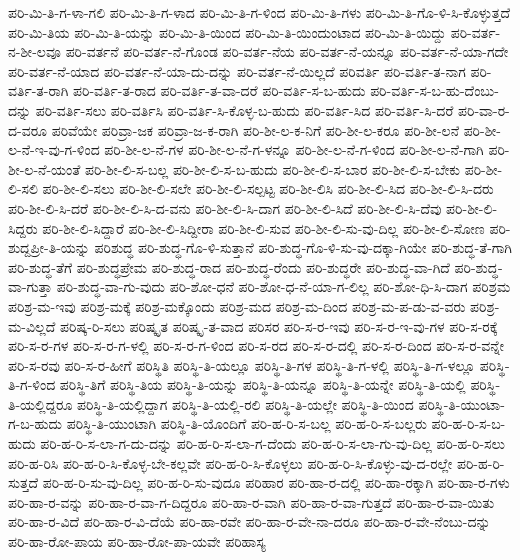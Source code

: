 {ಪರಿ-ಮಿ-ತಿ-ಗ-ಳಾ-ಗಲಿ
ಪರಿ-ಮಿ-ತಿ-ಗ-ಳಾದ
ಪರಿ-ಮಿ-ತಿ-ಗ-ಳಿಂದ
ಪರಿ-ಮಿ-ತಿ-ಗಳು
ಪರಿ-ಮಿ-ತಿ-ಗೊ-ಳಿ-ಸಿ-ಕೊಳ್ಳುತ್ತದೆ
ಪರಿ-ಮಿ-ತಿಯ
ಪರಿ-ಮಿ-ತಿ-ಯನ್ನು
ಪರಿ-ಮಿ-ತಿ-ಯಿಂದ
ಪರಿ-ಮಿ-ತಿ-ಯಿಂದುಂಟಾದ
ಪರಿ-ಮಿ-ತಿ-ಯಿದ್ದು
ಪರಿ-ವರ್ತ-ನ-ಶೀ-ಲವೂ
ಪರಿ-ವರ್ತನೆ
ಪರಿ-ವರ್ತ-ನೆ-ಗೊಂಡ
ಪರಿ-ವರ್ತ-ನೆಯ
ಪರಿ-ವರ್ತ-ನೆ-ಯನ್ನೂ
ಪರಿ-ವರ್ತ-ನೆ-ಯಾ-ಗದೇ
ಪರಿ-ವರ್ತ-ನೆ-ಯಾದ
ಪರಿ-ವರ್ತ-ನೆ-ಯಾ-ದು-ದನ್ನು
ಪರಿ-ವರ್ತ-ನೆ-ಯಿಲ್ಲದೆ
ಪರಿವರ್ತಿ
ಪರಿ-ವರ್ತಿ-ತ-ನಾಗ
ಪರಿ-ವರ್ತಿ-ತ-ರಾಗಿ
ಪರಿ-ವರ್ತಿ-ತ-ರಾದ
ಪರಿ-ವರ್ತಿ-ತ-ವಾ-ದರೆ
ಪರಿ-ವರ್ತಿ-ಸ-ಬ-ಹುದು
ಪರಿ-ವರ್ತಿ-ಸ-ಬ-ಹು-ದೆಂಬು-ದನ್ನು
ಪರಿ-ವರ್ತಿ-ಸಲು
ಪರಿ-ವರ್ತಿಸಿ
ಪರಿ-ವರ್ತಿ-ಸಿ-ಕೊಳ್ಳ-ಬ-ಹುದು
ಪರಿ-ವರ್ತಿ-ಸಿದ
ಪರಿ-ವರ್ತಿ-ಸಿ-ದರೆ
ಪರಿ-ವಾ-ರ-ದ-ವರೂ
ಪರಿವೆಯೇ
ಪರಿವ್ರಾ-ಜಕ
ಪರಿವ್ರಾ-ಜ-ಕ-ರಾಗಿ
ಪರಿ-ಶೀ-ಲ-ಕ-ನಿಗೆ
ಪರಿ-ಶೀ-ಲ-ಕರೂ
ಪರಿ-ಶೀ-ಲನೆ
ಪರಿ-ಶೀ-ಲ-ನೆ-ಇ-ವು-ಗ-ಳಿಂದ
ಪರಿ-ಶೀ-ಲ-ನೆ-ಗಳ
ಪರಿ-ಶೀ-ಲ-ನೆ-ಗ-ಳನ್ನೂ
ಪರಿ-ಶೀ-ಲ-ನೆ-ಗ-ಳಿಂದ
ಪರಿ-ಶೀ-ಲ-ನೆ-ಗಾಗಿ
ಪರಿ-ಶೀ-ಲ-ನೆ-ಯಂತೆ
ಪರಿ-ಶೀ-ಲಿ-ಸ-ಬಲ್ಲ
ಪರಿ-ಶೀ-ಲಿ-ಸ-ಬ-ಹುದು
ಪರಿ-ಶೀ-ಲಿ-ಸ-ಬಾರ
ಪರಿ-ಶೀ-ಲಿ-ಸ-ಬೇಕು
ಪರಿ-ಶೀ-ಲಿ-ಸಲಿ
ಪರಿ-ಶೀ-ಲಿ-ಸಲು
ಪರಿ-ಶೀ-ಲಿ-ಸಲೇ
ಪರಿ-ಶೀ-ಲಿ-ಸಲ್ಪಟ್ಟ
ಪರಿ-ಶೀ-ಲಿಸಿ
ಪರಿ-ಶೀ-ಲಿ-ಸಿದ
ಪರಿ-ಶೀ-ಲಿ-ಸಿ-ದರು
ಪರಿ-ಶೀ-ಲಿ-ಸಿ-ದರೆ
ಪರಿ-ಶೀ-ಲಿ-ಸಿ-ದ-ವನು
ಪರಿ-ಶೀ-ಲಿ-ಸಿ-ದಾಗ
ಪರಿ-ಶೀ-ಲಿ-ಸಿದೆ
ಪರಿ-ಶೀ-ಲಿ-ಸಿ-ದೆವು
ಪರಿ-ಶೀ-ಲಿ-ಸಿದ್ದರು
ಪರಿ-ಶೀ-ಲಿ-ಸಿದ್ದಾರೆ
ಪರಿ-ಶೀ-ಲಿ-ಸಿದ್ದೀರಾ
ಪರಿ-ಶೀ-ಲಿ-ಸುವ
ಪರಿ-ಶೀ-ಲಿ-ಸು-ವು-ದಿಲ್ಲ
ಪರಿ-ಶೀ-ಲಿ-ಸೋಣ
ಪರಿ-ಶುದ್ದಪ್ರೀ-ತಿ-ಯನ್ನು
ಪರಿಶುದ್ಧ
ಪರಿ-ಶುದ್ಧ-ಗೊ-ಳಿ-ಸುತ್ತಾನೆ
ಪರಿ-ಶುದ್ಧ-ಗೊ-ಳಿ-ಸು-ವು-ದಕ್ಕಾ-ಗಿಯೇ
ಪರಿ-ಶುದ್ಧ-ತೆ-ಗಾಗಿ
ಪರಿ-ಶುದ್ಧ-ತೆಗೆ
ಪರಿ-ಶುದ್ಧಪ್ರೇಮ
ಪರಿ-ಶುದ್ಧ-ರಾದ
ಪರಿ-ಶುದ್ಧ-ರೆಂದು
ಪರಿ-ಶುದ್ಧರೇ
ಪರಿ-ಶುದ್ಧ-ವಾ-ಗಿದೆ
ಪರಿ-ಶುದ್ಧ-ವಾ-ಗುತ್ತಾ
ಪರಿ-ಶುದ್ಧ-ವಾ-ಗು-ವುದು
ಪರಿ-ಶೋ-ಧನೆ
ಪರಿ-ಶೋ-ಧ-ನೆ-ಯಾ-ಗ-ಲಿಲ್ಲ
ಪರಿ-ಶೋ-ಧಿ-ಸಿ-ದಾಗ
ಪರಿಶ್ರಮ
ಪರಿಶ್ರ-ಮ-ಇವು
ಪರಿಶ್ರ-ಮಕ್ಕೆ
ಪರಿಶ್ರ-ಮಕ್ಕೊಂದು
ಪರಿಶ್ರ-ಮದ
ಪರಿಶ್ರ-ಮ-ದಿಂದ
ಪರಿಶ್ರ-ಮ-ಪ-ಡು-ವ-ವರು
ಪರಿಶ್ರ-ಮ-ವಿಲ್ಲದೆ
ಪರಿಷ್ಕ-ರಿ-ಸಲು
ಪರಿಷ್ಕೃತ
ಪರಿಷ್ಕೃ-ತ-ವಾದ
ಪರಿಸರ
ಪರಿ-ಸ-ರ-ಇವು
ಪರಿ-ಸ-ರ-ಇ-ವು-ಗಳ
ಪರಿ-ಸ-ರಕ್ಕೆ
ಪರಿ-ಸ-ರ-ಗಳ
ಪರಿ-ಸ-ರ-ಗ-ಳಲ್ಲಿ
ಪರಿ-ಸ-ರ-ಗ-ಳಿಂದ
ಪರಿ-ಸ-ರದ
ಪರಿ-ಸ-ರ-ದಲ್ಲಿ
ಪರಿ-ಸ-ರ-ದಿಂದ
ಪರಿ-ಸ-ರ-ವನ್ನೇ
ಪರಿ-ಸ-ರವು
ಪರಿ-ಸ-ರ-ಹೀಗೆ
ಪರಿಸ್ಥಿತಿ
ಪರಿಸ್ಥಿ-ತಿ-ಯಲ್ಲೂ
ಪರಿಸ್ಥಿ-ತಿ-ಗಳ
ಪರಿಸ್ಥಿ-ತಿ-ಗ-ಳಲ್ಲಿ
ಪರಿಸ್ಥಿ-ತಿ-ಗ-ಳಲ್ಲೂ
ಪರಿಸ್ಥಿ-ತಿ-ಗ-ಳಿಂದ
ಪರಿಸ್ಥಿ-ತಿಗೆ
ಪರಿಸ್ಥಿ-ತಿಯ
ಪರಿಸ್ಥಿ-ತಿ-ಯನ್ನು
ಪರಿಸ್ಥಿ-ತಿ-ಯನ್ನೂ
ಪರಿಸ್ಥಿ-ತಿ-ಯನ್ನೇ
ಪರಿಸ್ಥಿ-ತಿ-ಯಲ್ಲಿ
ಪರಿಸ್ಥಿ-ತಿ-ಯಲ್ಲಿದ್ದರೂ
ಪರಿಸ್ಥಿ-ತಿ-ಯಲ್ಲಿದ್ದಾಗ
ಪರಿಸ್ಥಿ-ತಿ-ಯಲ್ಲಿ-ರಲಿ
ಪರಿಸ್ಥಿ-ತಿ-ಯಲ್ಲೇ
ಪರಿಸ್ಥಿ-ತಿ-ಯಿಂದ
ಪರಿಸ್ಥಿ-ತಿ-ಯುಂಟಾ-ಗ-ಬ-ಹುದು
ಪರಿಸ್ಥಿ-ತಿ-ಯುಂಟಾಗಿ
ಪರಿಸ್ಥಿ-ತಿ-ಯೊಂದಿಗೆ
ಪರಿ-ಹ-ರಿ-ಸ-ಬಲ್ಲ
ಪರಿ-ಹ-ರಿ-ಸ-ಬಲ್ಲರು
ಪರಿ-ಹ-ರಿ-ಸ-ಬ-ಹುದು
ಪರಿ-ಹ-ರಿ-ಸ-ಲಾ-ಗ-ದು-ದನ್ನು
ಪರಿ-ಹ-ರಿ-ಸ-ಲಾ-ಗ-ದೆಂದು
ಪರಿ-ಹ-ರಿ-ಸ-ಲಾ-ಗು-ವು-ದಿಲ್ಲ
ಪರಿ-ಹ-ರಿ-ಸಲು
ಪರಿ-ಹ-ರಿಸಿ
ಪರಿ-ಹ-ರಿ-ಸಿ-ಕೊಳ್ಳ-ಬೇ-ಕಲ್ಲವೇ
ಪರಿ-ಹ-ರಿ-ಸಿ-ಕೊಳ್ಳಲು
ಪರಿ-ಹ-ರಿ-ಸಿ-ಕೊಳ್ಳು-ವು-ದ-ರಲ್ಲೇ
ಪರಿ-ಹ-ರಿ-ಸುತ್ತದೆ
ಪರಿ-ಹ-ರಿ-ಸು-ವು-ದಿಲ್ಲ
ಪರಿ-ಹ-ರಿ-ಸು-ವುದೂ
ಪರಿಹಾರ
ಪರಿ-ಹಾ-ರ-ದಲ್ಲಿ
ಪರಿ-ಹಾ-ರಕ್ಕಾಗಿ
ಪರಿ-ಹಾ-ರ-ಗಳು
ಪರಿ-ಹಾ-ರ-ವನ್ನು
ಪರಿ-ಹಾ-ರ-ವಾ-ಗ-ದಿದ್ದರೂ
ಪರಿ-ಹಾ-ರ-ವಾಗಿ
ಪರಿ-ಹಾ-ರ-ವಾ-ಗುತ್ತದೆ
ಪರಿ-ಹಾ-ರ-ವಾ-ಯಿತು
ಪರಿ-ಹಾ-ರ-ವಿದೆ
ಪರಿ-ಹಾ-ರ-ವಿ-ದೆಯೆ
ಪರಿ-ಹಾ-ರವೇ
ಪರಿ-ಹಾ-ರ-ವೇ-ನಾ-ದರೂ
ಪರಿ-ಹಾ-ರ-ವೇ-ನೆಂಬು-ದನ್ನು
ಪರಿ-ಹಾ-ರೋ-ಪಾಯ
ಪರಿ-ಹಾ-ರೋ-ಪಾ-ಯವೇ
ಪರಿಹಾಸ್ಯ
}
